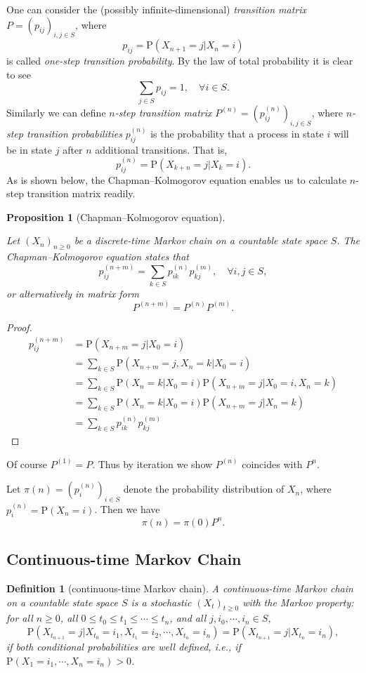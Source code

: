 \documentclass{article}
\newtheorem{definition}{Definition}[section]
\newtheorem{proposition}{Proposition}[section]
\theoremstyle{nonumberplain}
\newtheorem{proof}{Proof.}
\begin{document}
\noindent One can consider the (possibly infinite-dimensional) \emph{transition matrix}	$P=(p_{ij})_{i,j\in S}$, where
\[
p_{ij}=\mathrm{P}(X_{n+1}=j| X_{n}=i)
\]
is called \emph{one-step transition probability}. By the law of total probability it is clear to see 
\[
\sum_{j\in S}p_{ij}=1,\quad\forall i\in S.
\]
Similarly we can define \emph{$n$-step transition matrix} $P^{(n)}=\left(p^{(n)}_{ij}\right)_{i,j\in S}$, where \emph{$n$-step transition probabilities} $p^{(n)}_{ij}$ is the probability that a process in state $i$ will be in state $j$ after $n$ additional transitions. That is,
\[
p^{(n)}_{ij}=\mathrm{P}(X_{k+n}=j| X_{k}=i).
\]
As is shown below, the Chapman–Kolmogorov equation enables us to calculate $n$-step transition matrix readily.
\begin{proposition}[Chapman–Kolmogorov equation]\hypertarget{Proposition 4.1}{}
Let $(X_n)_{n\ge0}$ be a discrete-time Markov chain on a countable state space $S$. The \emph{Chapman–Kolmogorov equation} states that
\[
p^{(n+m)}_{ij}=\sum_{k\in S}p^{(n)}_{ik}p^{(m)}_{kj},\quad\forall i,j\in S,
\]
or alternatively in matrix form
\[
P^{(n+m)}=P^{(n)}P^{(m)}.
\]
\end{proposition}
\begin{proof}
	\[
	\begin{aligned}
		p^{(n+m)}_{ij}&=\mathrm{P}(X_{n+m}=j| X_{0}=i)\\
		&=\sum_{k\in S}\mathrm{P}(X_{n+m}=j,X_{n}=k| X_{0}=i)\\
		&=\sum_{k\in S}\mathrm{P}(X_{n}=k| X_{0}=i)\mathrm{P}(X_{n+m}=j| X_{0}=i,X_{n}=k)\\
		&=\sum_{k\in S}\mathrm{P}(X_{n}=k| X_{0}=i)\mathrm{P}(X_{n+m}=j| X_{n}=k)\\
		&=\sum_{k\in S}p^{(n)}_{ik}p^{(m)}_{kj}
	\end{aligned}
	\]
\end{proof}
\noindent Of course $P^{(1)}=P$. Thus by iteration we show $P^{(n)}$ coincides with $P^n$. 

\noindent Let $\pi(n)=\left(p_i^{(n)}\right)_{i\in S}$ denote the probability distribution of $X_n$, where $p_i^{(n)}=\mathrm{P}(X_n=i)$. Then we have
\[
\pi(n)=\pi(0)P^n.
\]

\subsection{Continuous-time Markov Chain}

\begin{definition}[continuous-time Markov chain]
	A \emph{continuous-time Markov chain} on a countable state space $S$ is a stochastic $(X_t)_{t\ge 0}$ with the Markov property: for all $ n\ge0$, all $0\le t_0\le t_1\le \cdots\le t_n$, and all	$j,i_0,\cdots,i_n\in S$,
	\[
	\mathrm{P}(X_{t_{n+1}}=j| X_{t_0}=i_{1},X_{t_1}=i_{2},\cdots,X_{t_n}=i_{n})=\mathrm{P}(X_{t_{n+1}}=j| X_{t_n}=i_{n}), 
	\] if both conditional probabilities are well defined, i.e., if $ 	\mathrm{P}(X_{1}=i_{1},\cdots ,X_{n}=i_{n})>0$.
\end{definition}
\end{document}
